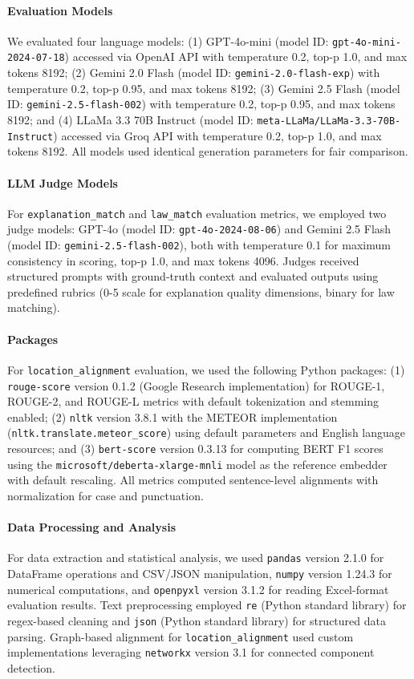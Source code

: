 \documentclass[11pt]{article}
\begin{document}
\paragraph{Evaluation Models} We evaluated four language models: (1) GPT-4o-mini (model ID: \texttt{gpt-4o-mini-2024-07-18}) accessed via OpenAI API with temperature 0.2, top-p 1.0, and max tokens 8192; (2) Gemini 2.0 Flash (model ID: \texttt{gemini-2.0-flash-exp}) with temperature 0.2, top-p 0.95, and max tokens 8192; (3) Gemini 2.5 Flash (model ID: \texttt{gemini-2.5-flash-002}) with temperature 0.2, top-p 0.95, and max tokens 8192; and (4) LLaMa 3.3 70B Instruct (model ID: \texttt{meta-LLaMa/LLaMa-3.3-70B-Instruct}) accessed via Groq API with temperature 0.2, top-p 1.0, and max tokens 8192. All models used identical generation parameters for fair comparison.

\paragraph{LLM Judge Models} For \texttt{explanation\_match} and \texttt{law\_match} evaluation metrics, we employed two judge models: GPT-4o (model ID: \texttt{gpt-4o-2024-08-06}) and Gemini 2.5 Flash (model ID: \texttt{gemini-2.5-flash-002}), both with temperature 0.1 for maximum consistency in scoring, top-p 1.0, and max tokens 4096. Judges received structured prompts with ground-truth context and evaluated outputs using predefined rubrics (0-5 scale for explanation quality dimensions, binary for law matching).

\paragraph{Packages} For \texttt{location\_alignment} evaluation, we used the following Python packages: (1) \texttt{rouge-score} version 0.1.2 (Google Research implementation) for ROUGE-1, ROUGE-2, and ROUGE-L metrics with default tokenization and stemming enabled; (2) \texttt{nltk} version 3.8.1 with the METEOR implementation (\texttt{nltk.translate.meteor\_score}) using default parameters and English language resources; and (3) \texttt{bert-score} version 0.3.13 for computing BERT F1 scores using the \texttt{microsoft/deberta-xlarge-mnli} model as the reference embedder with default rescaling. All metrics computed sentence-level alignments with normalization for case and punctuation.

\paragraph{Data Processing and Analysis} For data extraction and statistical analysis, we used \texttt{pandas} version 2.1.0 for DataFrame operations and CSV/JSON manipulation, \texttt{numpy} version 1.24.3 for numerical computations, and \texttt{openpyxl} version 3.1.2 for reading Excel-format evaluation results. Text preprocessing employed \texttt{re} (Python standard library) for regex-based cleaning and \texttt{json} (Python standard library) for structured data parsing. Graph-based alignment for \texttt{location\_alignment} used custom implementations leveraging \texttt{networkx} version 3.1 for connected component detection.
\end{document}
